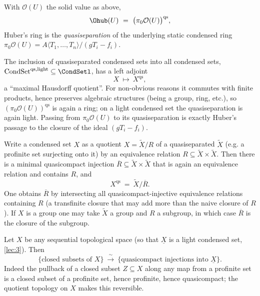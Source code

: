\begin{corollary}[Huber $=$ quasiseparation of $\pi_{0}$ of the solid value]
\label{cor:10:huber-quasisep}
With $\mathcal O(U)$ the solid value as above,
\begin{equation*}
\Ohub(U)\ =\ \bigl(\pi_{0}\mathcal O(U)\bigr)^{\mathrm{qs}},
\end{equation*}
Huber's ring is the \emph{quasiseparation} of the underlying static condensed ring
$\pi_{0}\mathcal O(U)=A\langle T_{1},\dots,T_{n}\rangle/(gT_{i}-f_{i})$.
\end{corollary}

\begin{remark}
\label{rmk:10:qs-functor}
The inclusion of quasiseparated condensed sets into all condensed sets,
$\mathrm{CondSet}^{\mathrm{qs},\mathrm{light}}\subseteq\CondSetl$, has a left adjoint
\begin{equation*}
X\ \longmapsto\ X^{\mathrm{qs}},
\end{equation*}
a ``maximal Hausdorff quotient''. For non-obvious reasons it commutes with finite
products, hence preserves algebraic structures (being a group, ring, etc.), so
$(\pi_{0}\mathcal O(U))^{\mathrm{qs}}$ is again a ring; on a light condensed set
the quasiseparation is again light. Passing from $\pi_{0}\mathcal O(U)$ to its
quasiseparation is exactly Huber's passage to the closure of the ideal
$(gT_{i}-f_{i})$.
\end{remark}

\begin{lemma}
\label{lem:10:qs-equiv}
Write a condensed set $X$ as a quotient $X=\widetilde X/R$ of a quasiseparated
$\widetilde X$ (e.g. a profinite set surjecting onto it) by an equivalence
relation $R\subseteq\widetilde X\times\widetilde X$. Then there is a minimal
quasicompact injection $\overline R\subseteq\widetilde X\times\widetilde X$ that
is again an equivalence relation and contains $R$, and
\begin{equation*}
X^{\mathrm{qs}}\ =\ \widetilde X/\overline R .
\end{equation*}
One obtains $\overline R$ by intersecting all quasicompact-injective equivalence
relations containing $R$ (a transfinite closure that may add more than the naive
closure of $R$). If $X$ is a group one may take $\widetilde X$ a group and $R$ a
subgroup, in which case $\overline R$ is the closure of the subgroup.
\end{lemma}

\begin{lemma}
\label{lem:10:closed-subsets}
Let $X$ be any sequential topological space (so that $\underline X$ is a light
condensed set, \cref{lec:3}). Then
\begin{equation*}
\{\text{closed subsets of }X\}\ \xrightarrow{\ \sim\ }\
\{\text{quasicompact injections into }\underline X\}.
\end{equation*}
Indeed the pullback of a closed subset $Z\subseteq X$ along any map from a
profinite set is a closed subset of a profinite set, hence profinite, hence
quasicompact; the quotient topology on $X$ makes this reversible.
\end{lemma}

